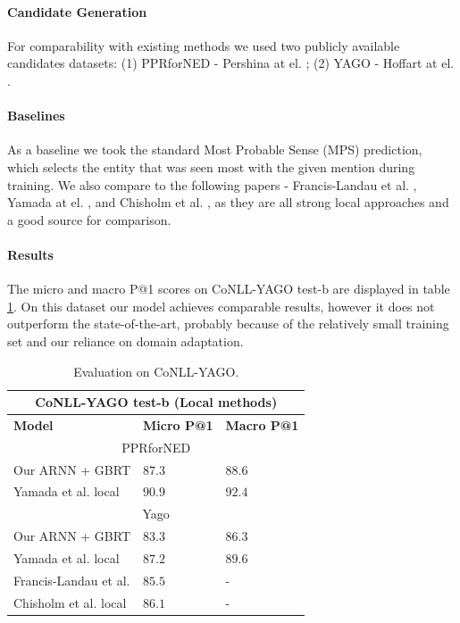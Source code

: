 \documentclass[11pt]{article}
\begin{document}
	\paragraph{Candidate Generation}
	For comparability with existing methods we used two publicly available candidates datasets: (1) PPRforNED - Pershina at el. ;
	(2) YAGO - Hoffart at el. .
	
	\paragraph{Baselines}
	As a baseline we took the standard Most Probable Sense (MPS) prediction, which selects the entity that was seen most with the given mention during training.
	We also compare to the following papers - Francis-Landau et al. ,  Yamada at el. , and Chisholm et al. , as they are all strong local approaches and a good source for comparison.
	
	
	\paragraph{Results}
	The micro and macro P@1 scores on CoNLL-YAGO test-b are displayed in table \ref{tab:conll}. On this dataset our model achieves comparable results, however it does not outperform the state-of-the-art, probably because of the relatively small training set and our reliance on domain adaptation.
	
	\begin{table}[ht]
		\begin{center}
			\begin{tabular}{|p{3.5cm}| p{1.3cm} p{1.3cm}|}
				\hline \multicolumn{3}{|c|}{CoNLL-YAGO test-b (Local methods)} \\
				\hline \textbf{Model} & \textbf{Micro P@1} & \textbf{Macro P@1} \\ 
				\hline \multicolumn{3}{|c|}{PPRforNED} \\
				\hline Our ARNN + GBRT    & $87.3$  & $88.6$ \\
				Yamada et al. local               & $90.9$  & $92.4$ \\
				\hline \multicolumn{3}{|c|}{Yago} \\
				\hline Our ARNN + GBRT    & $83.3$  & $86.3$ \\
				Yamada et al. local               & $87.2$  & $89.6$ \\
				Francis-Landau et al.             & $85.5$  & - \\
				Chisholm et al. local             & $86.1$  & - \\
				\hline
			\end{tabular}
		\end{center}
		\caption{\label{tab:conll} Evaluation on CoNLL-YAGO.}
	\end{table}
	
\end{document}
